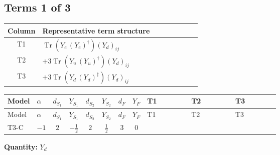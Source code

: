 \documentclass[8pt]{article}
\begin{document}
\begin{landscape}
\subsection*{Terms 1 of 3}
\begin{center}
\begin{tabular}{@{}c >{\raggedright\arraybackslash}p{0.82\linewidth}@{}}
\toprule
Column & Representative term structure \\
\midrule
T1 & \(\displaystyle \operatorname{Tr}\!\left({Y_e}\,\left({Y_e}\right)^{\dagger}\right) \left({Y_d}\right)_{ij}\) \\
\midrule
T2 & \(\displaystyle +3 \operatorname{Tr}\!\left({Y_u}\,\left({Y_u}\right)^{\dagger}\right) \left({Y_d}\right)_{ij}\) \\
\midrule
T3 & \(\displaystyle +3 \operatorname{Tr}\!\left({Y_d}\,\left({Y_d}\right)^{\dagger}\right) \left({Y_d}\right)_{ij}\) \\
\midrule
\bottomrule
\end{tabular}
\end{center}
\smallskip
\tiny
\begin{longtable}{@{}llcccccc >{\raggedright\arraybackslash}p{0.21\linewidth} >{\raggedright\arraybackslash}p{0.21\linewidth} >{\raggedright\arraybackslash}p{0.21\linewidth}@{}}
\toprule
Model & $\alpha$ & $d_{S_1}$ & $Y_{S_1}$ & $d_{S_2}$ & $Y_{S_2}$ & $d_F$ & $Y_F$ & T1 & T2 & T3 \\
\midrule
\endfirsthead
\toprule
Model & $\alpha$ & $d_{S_1}$ & $Y_{S_1}$ & $d_{S_2}$ & $Y_{S_2}$ & $d_F$ & $Y_F$ & T1 & T2 & T3 \\
\midrule
\endhead
T3-C & $-1$ & $2$ & $-\frac{1}{2}$ & $2$ & $\frac{1}{2}$ & $3$ & $0$ & \scriptsize\adjustbox{max width=\linewidth}{$\begin{gathered} \operatorname{Tr}\!\left({Y_e}\,\left({Y_e}\right)^{\dagger}\right) \left({Y_d}\right)_{ij}\end{gathered}$} & \scriptsize\adjustbox{max width=\linewidth}{$\begin{gathered} +3 \operatorname{Tr}\!\left({Y_u}\,\left({Y_u}\right)^{\dagger}\right) \left({Y_d}\right)_{ij}\end{gathered}$} & \scriptsize\adjustbox{max width=\linewidth}{$\begin{gathered} +3 \operatorname{Tr}\!\left({Y_d}\,\left({Y_d}\right)^{\dagger}\right) \left({Y_d}\right)_{ij}\end{gathered}$} \\
\midrule
\bottomrule
\end{longtable}
\clearpage
\noindent\textbf{Quantity: }$Y_d$\par\smallskip

\end{landscape}
\end{document}
